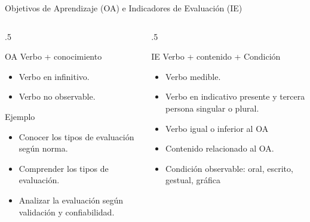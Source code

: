 \documentclass[11pt, aspectratio=169, xcolor=table,hyphens]{beamer}
\begin{document}
\begin{frame}{Objetivos de Aprendizaje (OA) e Indicadores de Evaluación (IE)}
	\begin{columns}
		\begin{column}{.5\linewidth}
			\begin{block}{OA}
				Verbo + conocimiento
				\begin{itemize}
					\item Verbo en infinitivo.
					\item Verbo no observable.
				\end{itemize}
			\end{block}
			\begin{exampleblock}{Ejemplo}
				\begin{itemize}
					\item Conocer los tipos de evaluación según norma.
					\item Comprender los tipos de evaluación.
					\item Analizar la evaluación según validación y confiabilidad.
				\end{itemize}
			\end{exampleblock}
		\end{column}
		\begin{column}{.5\linewidth}
			\begin{block}{IE}
				Verbo + contenido + Condición
				\begin{itemize}
					\item Verbo medible.
					\item Verbo en indicativo presente y tercera persona singular o plural.
					\item Verbo igual o inferior al OA
					\item Contenido relacionado al OA.
					\item Condición observable: oral, escrito, gestual, gráfica
				\end{itemize}
			\end{block}
		\end{column}
	\end{columns}
\end{frame}
\end{document}
